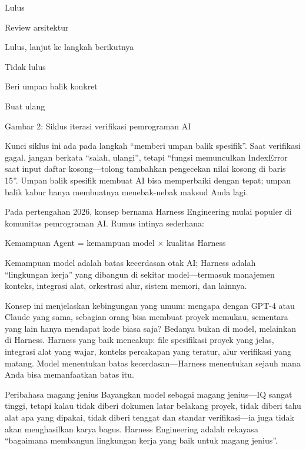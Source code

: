 Lulus

Review arsitektur

Lulus, lanjut ke langkah berikutnya

Tidak lulus

Beri umpan balik konkret

Buat ulang

\begin{center}\small\color{gray}Gambar 2: Siklus iterasi verifikasi pemrograman AI\end{center}

Kunci siklus ini ada pada langkah “memberi umpan balik spesifik”. Saat verifikasi gagal, jangan berkata “salah, ulangi”, tetapi “fungsi memunculkan IndexError saat input daftar kosong—tolong tambahkan pengecekan nilai kosong di baris 15”. Umpan balik spesifik membuat AI bisa memperbaiki dengan tepat; umpan balik kabur hanya membuatnya menebak-nebak maksud Anda lagi.


Pada pertengahan 2026, konsep bernama Harness Engineering mulai populer di komunitas pemrograman AI. Rumus intinya sederhana:

Kemampuan Agent = kemampuan model × kualitas Harness

Kemampuan model adalah batas kecerdasan otak AI; Harness adalah “lingkungan kerja” yang dibangun di sekitar model—termasuk manajemen konteks, integrasi alat, orkestrasi alur, sistem memori, dan lainnya.

Konsep ini menjelaskan kebingungan yang umum: mengapa dengan GPT-4 atau Claude yang sama, sebagian orang bisa membuat proyek memukau, sementara yang lain hanya mendapat kode biasa saja? Bedanya bukan di model, melainkan di Harness. Harness yang baik mencakup: file spesifikasi proyek yang jelas, integrasi alat yang wajar, konteks percakapan yang teratur, alur verifikasi yang matang. Model menentukan batas kecerdasan—Harness menentukan sejauh mana Anda bisa memanfaatkan batas itu.

\begin{tcbinfo}{Peribahasa magang jenius}
Bayangkan model sebagai magang jenius—IQ sangat tinggi, tetapi kalau tidak diberi dokumen latar belakang proyek, tidak diberi tahu alat apa yang dipakai, tidak diberi tenggat dan standar verifikasi—ia juga tidak akan menghasilkan karya bagus. Harness Engineering adalah rekayasa “bagaimana membangun lingkungan kerja yang baik untuk magang jenius”.

\end{tcbinfo}

